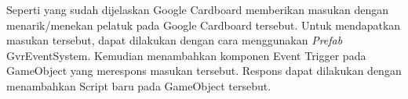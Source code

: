  Seperti yang sudah dijelaskan Google Cardboard memberikan masukan dengan menarik/menekan pelatuk pada Google Cardboard tersebut. Untuk mendapatkan masukan tersebut, dapat dilakukan dengan cara menggunakan \textit{Prefab} GvrEventSystem. Kemudian menambahkan komponen Event Trigger pada GameObject yang merespons masukan tersebut. Respons dapat dilakukan dengan menambahkan Script baru pada GameObject tersebut.